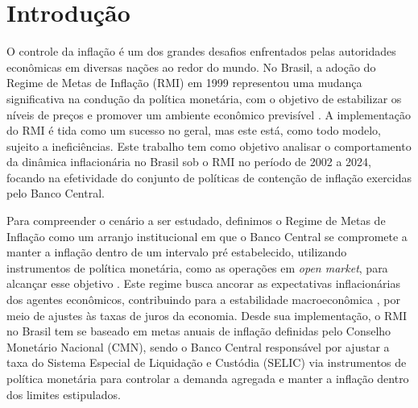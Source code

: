 \documentclass[12pt,oneside,a4paper,chapter=TITLE,english,brazil,sumario=abnt-6027-2012]{abntex2}
\begin{document}


\tableofcontents*
\cleardoublepage


\textual %
\pagestyle{simple}

\chapter{Introdução}

O controle da inflação é um dos grandes desafios enfrentados pelas autoridades econômicas em diversas nações ao redor do mundo. No Brasil, a adoção do Regime de Metas de Inflação (RMI) em 1999 representou uma mudança significativa na condução da política monetária, com o objetivo de estabilizar os níveis de preços e promover um ambiente econômico previsível \cite{fraga_2003_inflation}. A implementação do RMI é tida como um sucesso no geral, mas este está, como todo modelo, sujeito a ineficiências. Este trabalho tem como objetivo analisar o comportamento da dinâmica inflacionária no Brasil sob o RMI no período de 2002 a 2024, focando na efetividade do conjunto de políticas de contenção de inflação exercidas pelo Banco Central.

Para compreender o cenário a ser estudado, definimos o Regime de Metas de Inflação como um arranjo institucional em que o Banco Central se compromete a manter a inflação dentro de um intervalo pré estabelecido, utilizando instrumentos de política monetária, como as operações em \textit{open market}, para alcançar esse objetivo \cite{svensson_1997_inflation}. Este regime busca ancorar as expectativas inflacionárias dos agentes econômicos, contribuindo para a estabilidade macroeconômica \cite{mishkin_2000_inflation}, por meio de ajustes às taxas de juros da economia. Desde sua implementação, o RMI no Brasil tem se baseado em metas anuais de inflação definidas pelo Conselho Monetário Nacional (CMN), sendo o Banco Central responsável por ajustar a taxa do Sistema Especial de Liquidação e Custódia (SELIC) via instrumentos de política monetária para controlar a demanda agregada e manter a inflação dentro dos limites estipulados.
\end{document}
